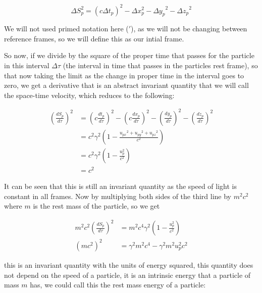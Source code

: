 \begin{equation}
	\Delta S_p^2 = (c\Delta {t}_p)^2-\Delta x_p^2-{\Delta y_p}^2-{\Delta z_p}^2
\end{equation}

We will not used primed notation here ($'$), as we will not be changing between reference frames, so we will define this as our intial frame.

So now, if we divide by the square of the proper time that passes for the particle in this interval ${\Delta\tau}$ (the interval in time that passes in the particles rest frame), so that now taking the limit as the change in proper time in the interval goes to zero, we get a derivative that is an abstract invariant quantity that we will call the space-time velocity, which reduces to the following:

\begin{equation}
	\begin{aligned}
		\left(\frac{dS_p}{d\tau}\right)^2 & = \left(c\frac{{{dt}_{p}}}{d\tau}\right)^2-\left(c\frac{dx_p}{d\tau}\right)^2-\left(\frac{dy_p}{d\tau}\right)^2-\left(\frac{dz_p}{d\tau}\right)^2 \\
		                                  & = {c}^2\gamma^2 \left( 1-\frac{{{u}_{px}}^2 + {{u}_{py}}^2 + {{u}_{pz}}^2}{{c}^2} \right)\\
										  & = {c}^2\gamma^2 \left( 1-\frac{u_p^2}{{c}^2} \right) \\
		                                  & = {c}^2
	\end{aligned}
\end{equation}

It can be seen that this is still an invariant quantity as the speed of light is constant in all frames.
Now by multiplying both sides of the third line by ${m}^2{c}^2$ where $m$ is the rest mass of the particle, so we get

\begin{equation}
	\label{eq: energy-momentum derivation}
	\begin{aligned}
		m^2 {c}^2 \left(\frac{dS_p}{d\tau}\right)^2 & = m^2{c}^4\gamma^2 \left( 1-\frac{u_p^2}{{c}^2} \right)  \\
		({m}{c}^2)^2                                & = \gamma^2 m^2 c^4-\gamma^2 m^2 u_p^2 {c}^2
	\end{aligned}
\end{equation}

this is an invariant quantity with the units of energy squared, this quantity does not depend on the speed of a particle, it is an intrinsic energy that a particle of mass $m$ has, we could call this the rest mass energy of a particle:

